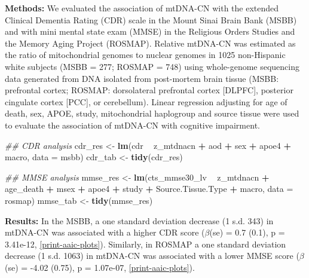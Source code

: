 \documentclass[]{book}
\newenvironment{Shaded}{\begin{snugshade}}{\end{snugshade}}
\newcommand{\CommentTok}[1]{\textcolor[rgb]{0.56,0.35,0.01}{\textit{#1}}}
\newcommand{\DataTypeTok}[1]{\textcolor[rgb]{0.13,0.29,0.53}{#1}}
\newcommand{\KeywordTok}[1]{\textcolor[rgb]{0.13,0.29,0.53}{\textbf{#1}}}
\newcommand{\NormalTok}[1]{#1}
\newcommand{\OperatorTok}[1]{\textcolor[rgb]{0.81,0.36,0.00}{\textbf{#1}}}
\newcommand{\StringTok}[1]{\textcolor[rgb]{0.31,0.60,0.02}{#1}}
\begin{document}
\textbf{Methods:} We evaluated the association of mtDNA-CN with the extended Clinical Dementia Rating (CDR) scale in the Mount Sinai Brain Bank (MSBB) and with mini mental state exam (MMSE) in the Religious Orders Studies and the Memory Aging Project (ROSMAP). Relative mtDNA-CN was estimated as the ratio of mitochondrial genomes to nuclear genomes in 1025 non-Hispanic white subjects (MSBB = 277; ROSMAP = 748) using whole-genome sequencing data generated from DNA isolated from post-mortem brain tissue (MSBB: prefrontal cortex; ROSMAP: dorsolateral prefrontal cortex {[}DLPFC{]}, posterior cingulate cortex {[}PCC{]}, or cerebellum). Linear regression adjusting for age of death, sex, APOE, study, mitochondrial haplogroup and source tissue were used to evaluate the association of mtDNA-CN with cognitive impairment.

\begin{Shaded}
\begin{Highlighting}[]
\CommentTok{## CDR analysis}
\NormalTok{cdr_res <-}\StringTok{ }\KeywordTok{lm}\NormalTok{(cdr }\OperatorTok{~}\StringTok{ }\NormalTok{z_mtdnacn  }\OperatorTok{+}\StringTok{ }\NormalTok{aod }\OperatorTok{+}\StringTok{ }\NormalTok{sex }\OperatorTok{+}\StringTok{ }\NormalTok{apoe4 }\OperatorTok{+}\StringTok{ }\NormalTok{macro, }\DataTypeTok{data =}\NormalTok{ msbb)}
\NormalTok{cdr_tab <-}\StringTok{ }\KeywordTok{tidy}\NormalTok{(cdr_res)}

\CommentTok{## MMSE analysis}
\NormalTok{mmse_res <-}\StringTok{ }\KeywordTok{lm}\NormalTok{(cts_mmse30_lv }\OperatorTok{~}\StringTok{ }\NormalTok{z_mtdnacn  }\OperatorTok{+}\StringTok{ }\NormalTok{age_death }\OperatorTok{+}\StringTok{ }\NormalTok{msex }\OperatorTok{+}\StringTok{ }\NormalTok{apoe4 }\OperatorTok{+}\StringTok{ }\NormalTok{study }\OperatorTok{+}\StringTok{ }\NormalTok{Source.Tissue.Type }\OperatorTok{+}\StringTok{ }\NormalTok{macro, }\DataTypeTok{data =}\NormalTok{ rosmap)}
\NormalTok{mmse_tab <-}\StringTok{ }\KeywordTok{tidy}\NormalTok{(mmse_res)}
\end{Highlighting}
\end{Shaded}

\textbf{Results:} In the MSBB, a one standard deviation decrease (1 s.d. 343) in mtDNA-CN was associated with a higher CDR score (\(\beta\)(se) = 0.7 (0.1), p = 3.41e-12, \ref{print-aaic-plots}). Similarly, in ROSMAP a one standard deviation decrease (1 s.d. 1063) in mtDNA-CN was associated with a lower MMSE score (\(\beta\)(se) = -4.02 (0.75), p = 1.07e-07, \ref{print-aaic-plots}).
\end{document}
